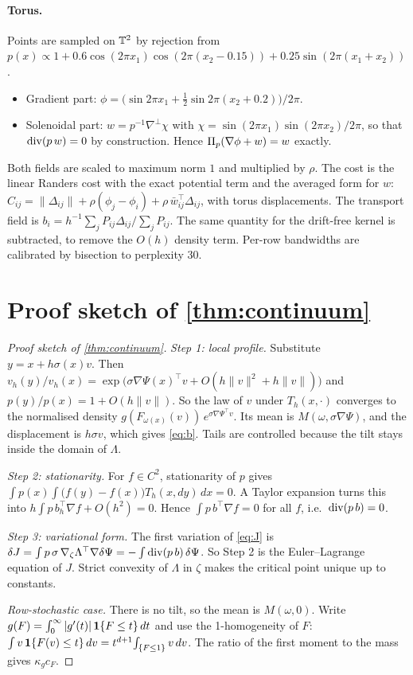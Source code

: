 \paragraph{Torus.}
Points are sampled on $\mathbb{T}^2$ by rejection from
$p(x)\propto1+0.6\cos(2\pi x_1)\cos(2\pi(x_2-0.15))+0.25\sin(2\pi(x_1+x_2))$.
\begin{itemize}
  \item Gradient part: $\phi=\big(\sin 2\pi x_1+\tfrac12\sin 2\pi(x_2+0.2)\big)/2\pi$.
  \item Solenoidal part: $w=p^{-1}\nabla^\perp\chi$ with
    $\chi=\sin(2\pi x_1)\sin(2\pi x_2)/2\pi$, so that $\operatorname{div}(p\,w)=0$ by
    construction. Hence $\Pi_p(\nabla\phi+w)=w$ exactly.
\end{itemize}
Both fields are scaled to maximum norm $1$ and multiplied by $\rho$. The
cost is the linear Randers cost with the exact potential term and the
averaged form for $w$:
$C_{ij}=\|\Delta_{ij}\|+\rho(\phi_j-\phi_i)+\rho\,\bar w_{ij}^\top\Delta_{ij}$,
with torus displacements. The transport field is
$b_i=h^{-1}\sum_jP_{ij}\Delta_{ij}/\sum_jP_{ij}$. The same quantity for
the drift-free kernel is subtracted, to remove the $O(h)$ density term.
Per-row bandwidths are calibrated by bisection to perplexity $30$.

\section{Proof sketch of \cref{thm:continuum}}
\label{app:continuum}

\begin{proof}[Proof sketch of \cref{thm:continuum}]
  \emph{Step 1: local profile.} Substitute $y=x+h\sigma(x)v$. Then
  $v_h(y)/v_h(x)=\exp\!\big(\sigma\nabla\Psi(x)^\top v+O(h\|v\|^2+h\|v\|)\big)$
  and $p(y)/p(x)=1+O(h\|v\|)$. So the law of $v$ under $T_h(x,\cdot)$
  converges to the normalised density
  $g(F_{\omega(x)}(v))\,e^{\sigma\nabla\Psi^\top v}$. Its mean is
  $M(\omega,\sigma\nabla\Psi)$, and the displacement is $h\sigma v$, which
  gives \eqref{eq:b}. Tails are controlled because the tilt stays inside
  the domain of $\Lambda$.

  \emph{Step 2: stationarity.} For $f\in C^2$, stationarity of $p$ gives
  $\int p(x)\int\big(f(y)-f(x)\big)T_h(x,dy)\,dx=0$. A Taylor expansion
  turns this into $h\int p\,b_h^\top\nabla f+O(h^2)=0$. Hence
  $\int p\,b^\top\nabla f=0$ for all $f$, i.e.\ $\operatorname{div}(p\,b)=0$.

  \emph{Step 3: variational form.} The first variation of \eqref{eq:J} is
  $\delta J=\int p\,\sigma\,\nabla_\zeta\Lambda^\top\nabla\delta\Psi
  =-\int\operatorname{div}(p\,b)\,\delta\Psi$. So Step 2 is the Euler--Lagrange equation
  of $J$. Strict convexity of $\Lambda$ in $\zeta$ makes the critical
  point unique up to constants.

  \emph{Row-stochastic case.} There is no tilt, so the mean is $M(\omega,0)$.
  Write $g(F)=\int_0^\infty|g'(t)|\,\mathbf{1}\{F\le t\}\,dt$ and use the
  1-homogeneity of $F$: $\int v\,\mathbf{1}\{F(v)\le t\}\,dv=t^{d+1}\!\int_{\{F\le1\}}v\,dv$.
  The ratio of the first moment to the mass gives $\kappa_g c_F$.
\end{proof}

